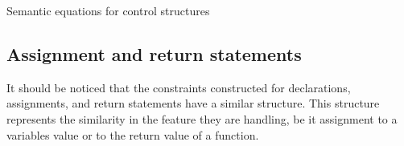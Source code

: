 \begin{table}[H]
\begin{semanticequations}
 \seSpace
 \seSpace
%
\end{semanticequations}
\caption{Semantic equations for control structures}
\label{cstr:controlstructures}
\end{table}

\subsection{Assignment and return statements}
It should be noticed that the constraints constructed for declarations, assignments, and return statements have a similar structure.
This structure represents the similarity in the feature they are handling, be it assignment to a variables value or to the return value of a function.

